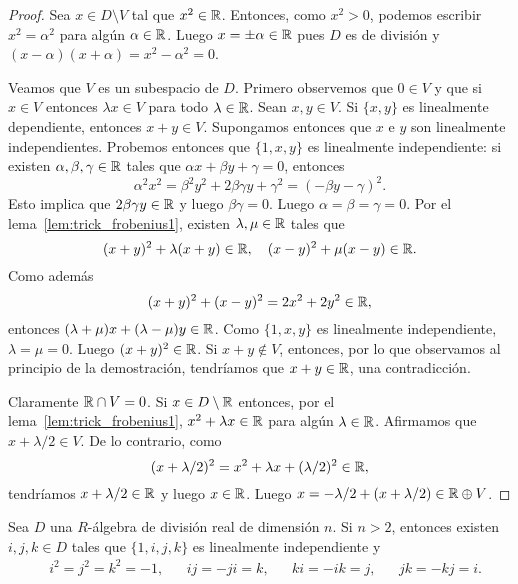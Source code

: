 \begin{proof}
	Sea $x\in D\setminus V$ tal que $x^2\in\mathbb{R}$. Entonces, como $x^2>0$, podemos
	escribir $x^2=\alpha^2$ para algún $\alpha\in\mathbb{R}$. Luego $x=\pm\alpha\in\mathbb{R}$
	pues $D$ es de división y $(x-\alpha)(x+\alpha)=x^2-\alpha^2=0$.

	Veamos que $V$ es un subespacio de $D$.  Primero observemos que $0\in V$ y
	que si $x\in V$ entonces $\lambda x\in V$ para todo $\lambda\in\mathbb{R}$.  Sean
	$x,y\in V$. Si $\{x,y\}$ es linealmente dependiente, entonces $x+y\in V$.
	Supongamos entonces que $x$ e $y$ son linealmente independientes. Probemos
	entonces que $\{1,x,y\}$ es linealmente independiente: si existen
	$\alpha,\beta,\gamma\in\mathbb{R}$ tales que $\alpha x+\beta y+\gamma=0$, entonces 
	\[
	\alpha^2x^2=\beta^2y^2+2\beta\gamma y+\gamma^2=(-\beta y-\gamma)^2.
	\]
	Esto implica que $2\beta\gamma y\in\mathbb{R}$ y luego $\beta\gamma=0$. Luego
	$\alpha=\beta=\gamma=0$. Por el lema~\ref{lem:trick_frobenius1}, existen
	$\lambda,\mu\in\mathbb{R}$ tales que
	\[
		(x+y)^2+\lambda(x+y)\in\mathbb{R},\quad
		(x-y)^2+\mu(x-y)\in\mathbb{R}.
	\]
	Como además
	\[
		(x+y)^2+(x-y)^2=2x^2+2y^2\in\mathbb{R},
	\]
	entonces $(\lambda+\mu)x+(\lambda-\mu)y\in\mathbb{R}$. Como $\{1,x,y\}$ es
	linealmente independiente, $\lambda=\mu=0$. Luego $(x+y)^2\in\mathbb{R}$. Si
	$x+y\not\in V$, entonces, por lo que observamos al principio de la
	demostración, tendríamos que $x+y\in\mathbb{R}$, una contradicción.

	Claramente $\mathbb{R}\cap V=0$. Si $x\in D\setminus\mathbb{R}$ entonces, por el
	lema~\ref{lem:trick_frobenius1}, $x^2+\lambda x\in\mathbb{R}$ para algún
	$\lambda\in\mathbb{R}$. Afirmamos que $x+\lambda/2\in V$. De lo contrario, 
	como 
	\[
	(x+\lambda/2)^2=x^2+\lambda x+(\lambda/2)^2\in\mathbb{R},
	\]
	tendríamos $x+\lambda/2\in\mathbb{R}$ y luego $x\in\mathbb{R}$. Luego
	$x=-\lambda/2+(x+\lambda/2)\in\mathbb{R}\oplus V$.
\end{proof}

\begin{lemma}
	\label{lem:trick_frobenius3}
	Sea $D$ una $R$-álgebra de división real de dimensión $n$. Si $n>2$, entonces
	existen $i,j,k\in D$ tales que $\{1,i,j,k\}$ es linealmente independiente y 
	\begin{align}
	\label{eq:H}
	&i^2=j^2=k^2=-1, && ij=-ji=k, && ki=-ik=j, && jk=-kj=i.
	\end{align}
\end{lemma}

